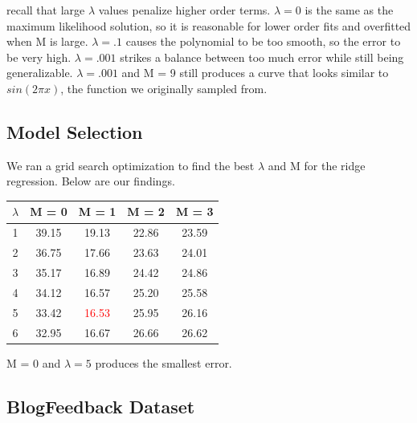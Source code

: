 \documentclass[10pt,twocolumn]{article}
\begin{document}
recall that large $\lambda$ values penalize higher order terms. $\lambda = 0$ is the same as the maximum likelihood solution, so it is reasonable for lower order fits and overfitted when M is large. $\lambda = .1$ causes the polynomial to be too smooth, so the error to be very high. $\lambda = .001$ strikes a balance between too much error while still being generalizable. $\lambda = .001$ and M = 9 still produces a curve that looks similar to $sin(2\pi x)$, the function we originally sampled from.

\subsection*{ Model Selection}

We ran a grid search optimization to find the best $\lambda$ and M for the ridge regression. Below are our findings.

\begin{center}
  \begin{tabular}{ | c | c | c | c | c | }
    \hline
     $\lambda$ & M = 0 & M = 1 &  M = 2 & M = 3 \\ \hline
     1 & 39.15 & 19.13 & 22.86 & 23.59 \\ \hline
     2 & 36.75 & 17.66 & 23.63 & 24.01 \\ \hline
     3 & 35.17 & 16.89 & 24.42 & 24.86  \\ \hline
     4 & 34.12 & 16.57 & 25.20 & 25.58  \\ \hline
     5 & 33.42 & \textcolor{red}{16.53} & 25.95 & 26.16  \\ \hline
     6 & 32.95 & 16.67 & 26.66 & 26.62  \\ \hline

    \hline
  \end{tabular}
\end{center}

M = 0 and $\lambda = 5$ produces the smallest error.

\subsection*{ BlogFeedback Dataset}
\end{document}

